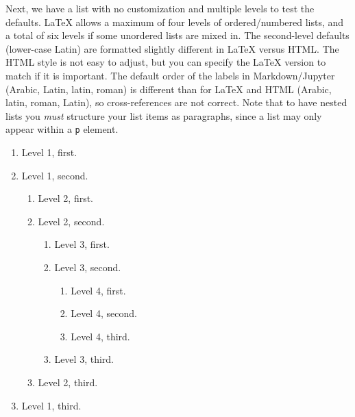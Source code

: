 \documentclass[10pt,]{article}
\theoremstyle{plain}
\theoremstyle{definition}
\theoremstyle{definition}
\theoremstyle{definition}
\theoremstyle{definition}
\theoremstyle{definition}
\theoremstyle{definition}
\numberwithin{equation}{section}
\begin{document}
%
\par
\hypertarget{p-321}{}%
Next, we have a list with no customization and multiple levels to test the defaults.  \LaTeX{} allows a maximum of four levels of ordered/numbered lists, and a total of six levels if some unordered lists are mixed in.  The second-level defaults (lower-case Latin) are formatted slightly different in \LaTeX{} versus HTML.  The HTML style is not easy to adjust, but you can  specify the \LaTeX{} version to match if it is important.  The default order of the labels in Markdown/Jupyter (Arabic, Latin, latin, roman) is different than for \LaTeX{} and HTML (Arabic, latin, roman, Latin), so cross-references are not correct.  Note that to have nested lists you \emph{must} structure your list items as paragraphs, since a list may only appear within a \lstinline?p? element.\leavevmode%
\begin{enumerate}
\item\hypertarget{li-56}{}\hypertarget{p-322}{}%
Level 1, first.%
\item\hypertarget{list-two}{}\hypertarget{p-323}{}%
Level 1, second.%
\begin{enumerate}
\item\hypertarget{li-58}{}\hypertarget{p-324}{}%
Level 2, first.%
\item\hypertarget{li-59}{}\hypertarget{p-325}{}%
Level 2, second.%
\begin{enumerate}
\item\hypertarget{li-60}{}\hypertarget{p-326}{}%
Level 3, first.%
\item\hypertarget{list-two-two-two}{}\hypertarget{p-327}{}%
Level 3, second.%
\begin{enumerate}
\item\hypertarget{li-62}{}\hypertarget{p-328}{}%
Level 4, first.%
\item\hypertarget{li-63}{}\hypertarget{p-329}{}%
Level 4, second.%
\item\hypertarget{list-two-two-two-three}{}\hypertarget{p-330}{}%
Level 4, third.%
\end{enumerate}
%
\item\hypertarget{li-65}{}\hypertarget{p-331}{}%
Level 3, third.%
\end{enumerate}
%
\item\hypertarget{li-66}{}\hypertarget{p-332}{}%
Level 2, third.%
\end{enumerate}
%
\item\hypertarget{li-67}{}\hypertarget{p-333}{}%
Level 1, third.%
\end{enumerate}
\end{document}
